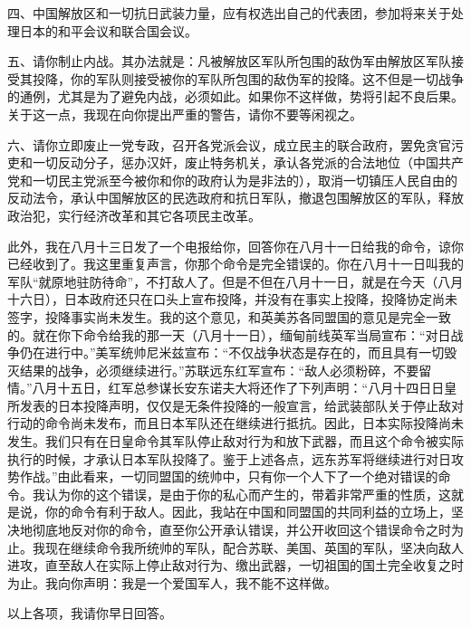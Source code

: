 四、中国解放区和一切抗日武装力量，应有权选出自己的代表团，参加将来关于处理日本的和平会议和联合国会议。

五、请你制止内战。其办法就是：凡被解放区军队所包围的敌伪军由解放区军队接受其投降，你的军队则接受被你的军队所包围的敌伪军的投降。这不但是一切战争的通例，尤其是为了避免内战，必须如此。如果你不这样做，势将引起不良后果。关于这一点，我现在向你提出严重的警告，请你不要等闲视之。

六、请你立即废止一党专政，召开各党派会议，成立民主的联合政府，罢免贪官污吏和一切反动分子，惩办汉奸，废止特务机关，承认各党派的合法地位（中国共产党和一切民主党派至今被你和你的政府认为是非法的），取消一切镇压人民自由的反动法令，承认中国解放区的民选政府和抗日军队，撤退包围解放区的军队，释放政治犯，实行经济改革和其它各项民主改革。

此外，我在八月十三日发了一个电报给你，回答你在八月十一日给我的命令，谅你已经收到了。我这里重复声言，你那个命令是完全错误的。你在八月十一日叫我的军队“就原地驻防待命”，不打敌人了。但是不但在八月十一日，就是在今天（八月十六日），日本政府还只在口头上宣布投降，并没有在事实上投降，投降协定尚未签字，投降事实尚未发生。我的这个意见，和英美苏各同盟国的意见是完全一致的。就在你下命令给我的那一天（八月十一日），缅甸前线英军当局宣布：“对日战争仍在进行中。”美军统帅尼米兹宣布：“不仅战争状态是存在的，而且具有一切毁灭结果的战争，必须继续进行。”苏联远东红军宣布：“敌人必须粉碎，不要留情。”八月十五日，红军总参谋长安东诺夫大将还作了下列声明：“八月十四日日皇所发表的日本投降声明，仅仅是无条件投降的一般宣言，给武装部队关于停止敌对行动的命令尚未发布，而且日本军队还在继续进行抵抗。因此，日本实际投降尚未发生。我们只有在日皇命令其军队停止敌对行为和放下武器，而且这个命令被实际执行的时候，才承认日本军队投降了。鉴于上述各点，远东苏军将继续进行对日攻势作战。”由此看来，一切同盟国的统帅中，只有你一个人下了一个绝对错误的命令。我认为你的这个错误，是由于你的私心而产生的，带着非常严重的性质，这就是说，你的命令有利于敌人。因此，我站在中国和同盟国的共同利益的立场上，坚决地彻底地反对你的命令，直至你公开承认错误，并公开收回这个错误命令之时为止。我现在继续命令我所统帅的军队，配合苏联、美国、英国的军队，坚决向敌人进攻，直至敌人在实际上停止敌对行为、缴出武器，一切祖国的国土完全收复之时为止。我向你声明：我是一个爱国军人，我不能不这样做。

以上各项，我请你早日回答。


